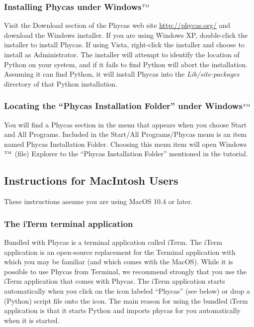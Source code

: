 \documentclass[10pt]{article}
\newcommand{\trademark}[1]{#1${}^{\mbox{\tiny TM}}$}
\newcommand{\pathname}[1]{{\em #1}}				%
\newcommand{\menu}[1]{{\sf #1}}					%
\begin{document}
\subsubsection{Installing Phycas under \trademark{Windows}}

Visit the Download section of the Phycas web site \url{http://phycas.org/} and download the Windows installer. If you are using Windows XP, double-click the installer to install Phycas. If using Vista, right-click the installer and choose to install as Administrator. The installer will attempt to identify the location of Python on your system, and if it fails to find Python will abort the installation. Assuming it can find Python, it will install Phycas into the \pathname{Lib/site-packages} directory of that Python installation. 

\subsubsection{Locating the ``Phycas Installation Folder'' under \trademark{Windows}} \label{subsubsec:installfolderwindows}

You will find a Phycas section in the menu that appears when you choose \menu{Start} and \menu{All Programs}. Included in the \menu{Start/All Programs/Phycas} menu is an item named \menu{Phycas Installation Folder}. Choosing this menu item will open \trademark{Windows} (file) Explorer to the ``Phycas Installation Folder'' mentioned in the tutorial.

\subsection{Instructions for MacIntosh Users}

These instructions assume you are using MacOS 10.4 or later.

\subsubsection{The iTerm terminal application}

Bundled with Phycas is a terminal application called iTerm. The iTerm application is an open-source replacement for the Terminal application with which you may be familiar (and which comes with the MacOS). While it is possible to use Phycas from Terminal, we recommend strongly that you use the iTerm application that comes with Phycas. The iTerm application starts automatically when you click on the icon labeled ``Phycas'' (see below) or drop a (Python) script file onto the icon. The main reason for using the bundled iTerm application is that it starts Python and imports phycas for you automatically when it is started.
\end{document}
